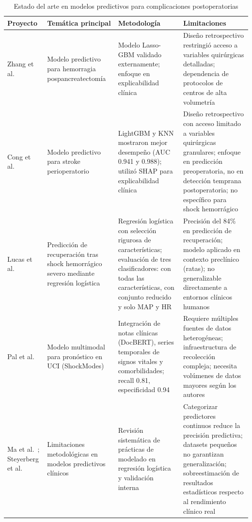\documentclass[12pt, letterpaper]{article}
\begin{document}
\begin{table}[H]
\centering
\caption{Estado del arte en modelos predictivos para complicaciones postoperatorias}
\label{tab:estado-arte}
\small
\begin{tabular}{|p{2.5cm}|p{3cm}|p{4.5cm}|p{4.5cm}|}
\hline
\textbf{Proyecto} & \textbf{Temática principal} & \textbf{Metodología} & \textbf{Limitaciones} \\ \hline
Zhang et al.\ \cite{zhang2025} & Modelo predictivo para hemorragia pospancreatectomía & Modelo Lasso-GBM validado externamente; enfoque en explicabilidad clínica & Diseño retrospectivo restringió acceso a variables quirúrgicas detalladas; dependencia de protocolos de centros de alta volumetría \\ \hline
Cong et al.\ \cite{cong2025} & Modelo predictivo para stroke perioperatorio & LightGBM y KNN mostraron mejor desempeño (AUC 0.941 y 0.988); utilizó SHAP para explicabilidad clínica & Diseño retrospectivo con acceso limitado a variables quirúrgicas granulares; enfoque en predicción preoperatoria, no en detección temprana postoperatoria; no específico para shock hemorrágico \\ \hline
Lucas et al.\ \cite{lucas2019} & Predicción de recuperación tras shock hemorrágico severo mediante regresión logística & Regresión logística con selección rigurosa de características; evaluación de tres clasificadores: con todas las características, con conjunto reducido y solo MAP y HR & Precisión del 84\% en predicción de recuperación; modelo aplicado en contexto preclínico (ratas); no generalizable directamente a entornos clínicos humanos \\ \hline
Pal et al.\ \cite{pal2022} & Modelo multimodal para pronóstico en UCI (ShockModes) & Integración de notas clínicas (DocBERT), series temporales de signos vitales y comorbilidades; recall 0.81, especificidad 0.94 & Requiere múltiples fuentes de datos heterogéneas; infraestructura de recolección compleja; necesita volúmenes de datos mayores según los autores \\ \hline
Ma et al.\ \cite{ma2023}; Steyerberg et al.\ \cite{steyerberg2018} & Limitaciones metodológicas en modelos predictivos clínicos & Revisión sistemática de prácticas de modelado en regresión logística y validación interna & Categorizar predictores continuos reduce la precisión predictiva; datasets pequeños no garantizan generalización; sobreestimación de resultados estadísticos respecto al rendimiento clínico real \\ \hline
\end{tabular}
\end{table}
\end{document}
